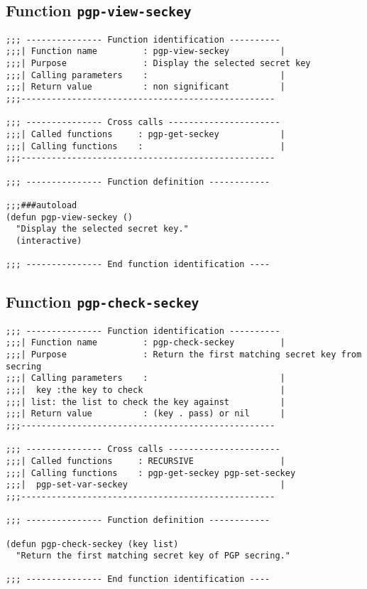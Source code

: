 \subsection{Function {\tt pgp-view-seckey}}
\leavevmode
\begin{verbatim}
;;; --------------- Function identification ----------
;;;| Function name         : pgp-view-seckey          |
;;;| Purpose               : Display the selected secret key
;;;| Calling parameters    :                          |
;;;| Return value          : non significant          |
;;;--------------------------------------------------

;;; --------------- Cross calls ----------------------
;;;| Called functions     : pgp-get-seckey            |
;;;| Calling functions    :                           |
;;;--------------------------------------------------

;;; --------------- Function definition ------------

;;;###autoload
(defun pgp-view-seckey ()
  "Display the selected secret key."
  (interactive)

;;; --------------- End function identification ----
\end{verbatim}
\subsection{Function {\tt pgp-check-seckey}}
\leavevmode
\begin{verbatim}
;;; --------------- Function identification ----------
;;;| Function name         : pgp-check-seckey         |
;;;| Purpose               : Return the first matching secret key from secring
;;;| Calling parameters    :                          |
;;;|  key :the key to check                           |
;;;| list: the list to check the key against          |
;;;| Return value          : (key . pass) or nil      |
;;;--------------------------------------------------

;;; --------------- Cross calls ----------------------
;;;| Called functions     : RECURSIVE                 |
;;;| Calling functions    : pgp-get-seckey pgp-set-seckey
;;;|  pgp-set-var-seckey                              |
;;;--------------------------------------------------

;;; --------------- Function definition ------------

(defun pgp-check-seckey (key list)
  "Return the first matching secret key of PGP secring."

;;; --------------- End function identification ----
\end{verbatim}
